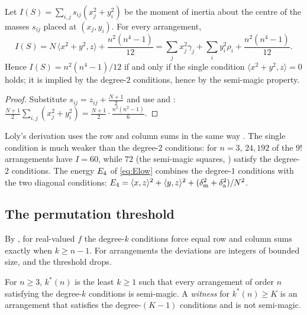 \begin{corollary}
\label{cor:loly}
Let $I(S)=\sum_{i,j}s_{ij}(x_{j}^{2}+y_{i}^{2})$ be the moment of inertia about the centre of the masses $s_{ij}$ placed at $(x_j,y_i)$.  For every arrangement,
\begin{equation}
I(S)=N\,\langle x^{2}+y^{2},z\rangle+\frac{n^{2}(n^{4}-1)}{12}
=\sum_j x_j^{2}\gamma_j+\sum_i y_i^{2}\rho_i+\frac{n^{2}(n^{4}-1)}{12}.
\label{eq:loly_identity}
\end{equation}
Hence $I(S)=n^{2}(n^{4}-1)/12$ if and only if the single condition $\langle x^2+y^2,z\rangle=0$ holds; it is implied by the degree-$2$ conditions, hence by the semi-magic property.
\end{corollary}

\begin{proof}
Substitute $s_{ij}=z_{ij}+\frac{N+1}2$ and use  and : $\frac{N+1}2\sum_{i,j}(x_j^{2}+y_i^{2})=\frac{N+1}2\cdot\frac{n^{2}(n^{2}-1)}{6}$.
\end{proof}

Loly's derivation uses the row and column sums in the same way \cite{loly2004invariance}.
The single condition is much weaker than the degree-$2$ conditions: for $n=3$, $24{,}192$ of the $9!$ arrangements have $I=60$, while $72$ (the semi-magic squares, ) satisfy the degree-$2$ conditions.
The energy $E_4$ of \eqref{eq:Elow} combines the degree-$1$ conditions with the two diagonal conditions: $E_4=\langle x,z\rangle^2+\langle y,z\rangle^2+(\delta_{\mathrm m}^2+\delta_{\mathrm a}^2)/N^2$.

\subsection{The permutation threshold}
\label{sec:kstar}

By , for real-valued $f$ the degree-$k$ conditions force equal row and column sums exactly when $k\ge n-1$.
For arrangements the deviations are integers of bounded size, and the threshold drops.

\begin{definition}
\label{def:kstar}
For $n\ge3$, $k^*(n)$ is the least $k\ge1$ such that every arrangement of order $n$ satisfying the degree-$k$ conditions is semi-magic.
A \emph{witness} for $k^*(n)\ge K$ is an arrangement that satisfies the degree-$(K-1)$ conditions and is not semi-magic.
\end{definition}

